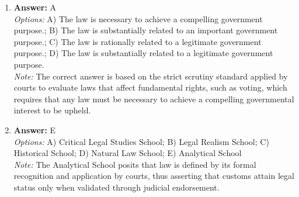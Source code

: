 \documentclass[12pt]{article}
\begin{document}
\begin{enumerate}[label=\arabic*.]
\item \textbf{Answer:} A
\\ \textit{Options:} A) The law is necessary to achieve a compelling government purpose.; B) The law is substantially related to an important government purpose.; C) The law is rationally related to a legitimate government purpose.; D) The law is substantially related to a legitimate government purpose.
\\ \textit{Note:} The correct answer is based on the strict scrutiny standard applied by courts to evaluate laws that affect fundamental rights, such as voting, which requires that any law must be necessary to achieve a compelling governmental interest to be upheld.
\item \textbf{Answer:} E
\\ \textit{Options:} A) Critical Legal Studies School; B) Legal Realism School; C) Historical School; D) Natural Law School; E) Analytical School
\\ \textit{Note:} The Analytical School posits that law is defined by its formal recognition and application by courts, thus asserting that customs attain legal status only when validated through judicial endorsement.
\end{enumerate}
\end{document}
